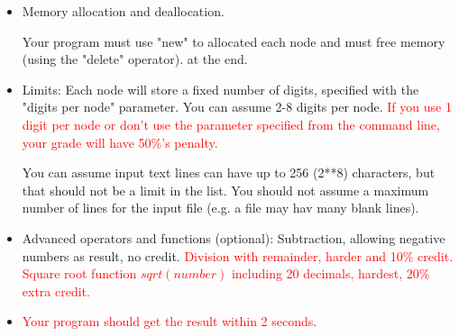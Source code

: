\documentclass[times,11pt,verbatim,js-singlespace]{article}  %
\begin{document}
\begin{itemize}
\item Memory allocation and deallocation.

Your program must use "new" to allocated each node and must free memory (using the "delete" operator).
at the end.


\item Limits:
Each node will store a fixed number of digits, specified with the "digits per node" parameter.
You can assume 2-8 digits per node. \textcolor{red}{If you use 1 digit per node or don't use the parameter specified from the command line, your grade will have 50\%'s penalty.}

You can assume input text lines can have up to 256 (2**8) characters,
but that should not be a limit in the list.
You should not assume a maximum number of lines for the input file 
(e.g. a file may hav many blank lines).

\item Advanced operators and functions (optional):
Subtraction, allowing negative numbers as result, no credit.
\textcolor{red}{Division with remainder, harder and 10\% credit.
Square root function $sqrt(number)$ including 20 decimals, hardest, 20\% extra credit.}

\item \textcolor{red}{Your program should get the result within 2 seconds}.
\end{itemize}


% 
\end{document}
